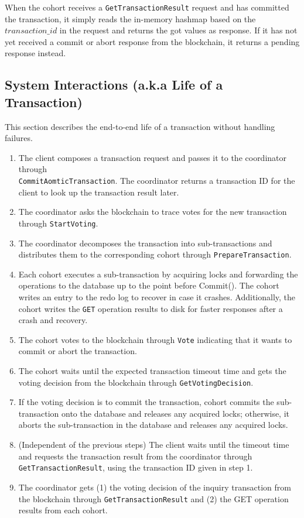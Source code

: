 \documentclass[11pt,conference]{IEEEtran}
\begin{document}
When the cohort receives a \texttt{GetTransaction\-Result} request and has committed the transaction, it simply reads the in-memory hashmap based on the $transaction\_id$ in the request and returns the got values as response. If it has not yet received a commit or abort response from the blockchain, it returns a pending response instead.

\subsection{System Interactions (a.k.a Life of a Transaction)} \label{txnflow}
This section describes the end-to-end life of a transaction without handling failures.

\begin{enumerate}
\item The client composes a transaction request and passes it to the coordinator through \texttt{\\CommitAomticTransaction}. The coordinator returns a transaction ID for the client to look up the transaction result later.
\item The coordinator asks the blockchain to trace votes for the new transaction through \texttt{StartVoting}.
\item The coordinator decomposes the transaction into sub-transactions and distributes them to the corresponding cohort through \texttt{PrepareTransaction}.
\item Each cohort executes a sub-transaction by acquiring locks and forwarding the operations to the database up to the point before Commit(). The cohort writes an entry to the redo log to recover in case it crashes. Additionally, the cohort writes the \texttt{GET} operation results to disk for faster responses after a crash and recovery.
\item The cohort votes to the blockchain through \texttt{Vote} indicating that it wants to commit or abort the transaction.
\item The cohort waits until the expected transaction timeout time and gets the voting decision from the blockchain through \texttt{GetVotingDecision}.
\item If the voting decision is to commit the transaction, cohort commits the sub-transaction onto the database and releases any acquired locks; otherwise, it aborts the sub-transaction in the database and releases any acquired locks.
\item (Independent of the previous steps) The client waits until the timeout time and requests the transaction result from the coordinator through \texttt{GetTransactionResult}, using the transaction ID given in step 1.
\item The coordinator gets (1) the voting decision of the inquiry transaction from the blockchain through \texttt{GetTransactionResult} and (2) the GET operation results from each cohort.
\end{enumerate}
\end{document}
